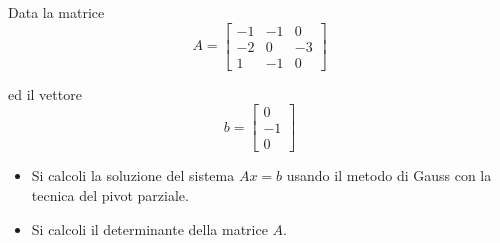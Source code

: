 Data la matrice
\bigskip
\[
A=\left[
\begin{array}{ccc}
-1 & -1 & 0 \\
-2 & 0 & -3\\
1 & -1 & 0
\end{array}\right]
\]

ed il vettore
\bigskip
\[
b=\left[
\begin{array}{ccc}
0\\
-1 \\
0
\end{array}\right]
\]
\begin{itemize}
\item Si calcoli la soluzione del sistema $Ax=b$ usando il metodo
di Gauss con la tecnica del pivot parziale.
\item Si calcoli il determinante della matrice $A$.
\end{itemize}
